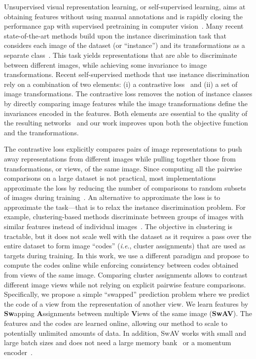 \documentclass{article}
\def\onedot{.}
\def\ie{\emph{i.e}\onedot} \def\Ie{\emph{I.e}\onedot}
\def\OURS{SwAV\xspace}
\begin{document}
Unsupervised visual representation learning, or self-supervised learning, aims at obtaining features without using manual annotations and is rapidly closing the performance gap with supervised pretraining in computer vision~\cite{chen2020simple,he2019momentum,misra2019self}.
Many recent state-of-the-art methods build upon the instance discrimination task that considers each image of the dataset (or ``instance'') and its transformations as a separate class~\cite{dosovitskiy2016discriminative}. 
This task yields representations that are able to discriminate between different images, while achieving some invariance to image transformations. 
Recent self-supervised methods that use instance discrimination rely on a combination of two elements: (i) a contrastive loss~\cite{hadsell2006dimensionality} and (ii) a set of image transformations. 
The contrastive loss removes the notion of instance classes by directly comparing image features while the image transformations define the invariances encoded in the features.
Both elements are essential to the quality of the resulting networks~\cite{misra2019self,chen2020simple} and our work improves upon both the objective function and the transformations.

The contrastive loss explicitly compares pairs of image representations to push away representations from different images while pulling together those from transformations, or views, of the same image.
Since computing all the pairwise comparisons on a large dataset is not practical, most implementations approximate the loss by reducing the number of comparisons to random subsets of images during training~\cite{chen2020simple,he2019momentum,wu2018unsupervised}.
An alternative to approximate the loss is to approximate the task---that is to relax the instance discrimination problem.
For example, clustering-based methods discriminate between groups of images with similar features instead of individual images~\cite{caron2018deep}. 
The objective in clustering is tractable, but it does not scale well with the dataset as it requires a pass over the entire dataset to form image ``codes'' (\ie, cluster assignments) that are used as targets during training.
In this work, we use a different paradigm and propose to compute the codes online while enforcing consistency between codes obtained from views of the same image.
Comparing cluster assignments allows to contrast different image views while not relying on explicit pairwise feature comparisons.
Specifically, we propose a simple ``swapped'' prediction problem where we predict the code of a view from the representation of another view.
We learn features by \textbf{Sw}apping \textbf{A}ssignments between multiple \textbf{V}iews of the same image (\textbf{\OURS}).
The features and the codes are learned online, allowing our method to scale to potentially unlimited amounts of data.
In addition, \OURS works with small and large batch sizes and does not need a large memory bank~\cite{wu2018unsupervised} or a momentum encoder~\cite{he2019momentum}.
\end{document}

